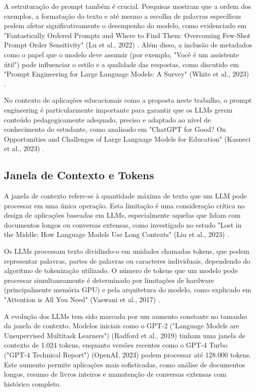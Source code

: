 \documentclass[tcc,capa]{texufpel}
\begin{document}
A estruturação do prompt também é crucial. Pesquisas mostram que a ordem dos exemplos, a formatação do texto e até mesmo a escolha de palavras específicas podem afetar significativamente o desempenho do modelo, como evidenciado em "Fantastically Ordered Prompts and Where to Find Them: Overcoming Few-Shot Prompt Order Sensitivity" (Lu et al., 2022) \cite{lu2022fantastically}. Além disso, a inclusão de metadados como o papel que o modelo deve assumir (por exemplo, "Você é um assistente útil") pode influenciar o estilo e a qualidade das respostas, como discutido em "Prompt Engineering for Large Language Models: A Survey" (White et al., 2023) \cite{white2023prompt}.

No contexto de aplicações educacionais como a proposta neste trabalho, o prompt engineering é particularmente importante para garantir que os LLMs gerem conteúdo pedagogicamente adequado, preciso e adaptado ao nível de conhecimento do estudante, como analisado em "ChatGPT for Good? On Opportunities and Challenges of Large Language Models for Education" (Kasneci et al., 2023) \cite{kasneci2023chatgpt}.

\subsection{Janela de Contexto e Tokens}

A janela de contexto refere-se à quantidade máxima de texto que um LLM pode processar em uma única operação. Esta limitação é uma consideração crítica no design de aplicações baseadas em LLMs, especialmente aquelas que lidam com documentos longos ou conversas extensas, como investigado no estudo "Lost in the Middle: How Language Models Use Long Contexts" (Liu et al., 2023) \cite{liu2023lost}.

Os LLMs processam texto dividindo-o em unidades chamadas tokens, que podem representar palavras, partes de palavras ou caracteres individuais, dependendo do algoritmo de tokenização utilizado. O número de tokens que um modelo pode processar simultaneamente é determinado por limitações de hardware (principalmente memória GPU) e pela arquitetura do modelo, como explicado em "Attention is All You Need" (Vaswani et al., 2017) \cite{vaswani2017attention}.

A evolução dos LLMs tem sido marcada por um aumento constante no tamanho da janela de contexto. Modelos iniciais como o GPT-2 ("Language Models are Unsupervised Multitask Learners") (Radford et al., 2019) \cite{radford2019language} tinham uma janela de contexto de 1.024 tokens, enquanto versões recentes como o GPT-4 Turbo ("GPT-4 Technical Report") (OpenAI, 2023) \cite{openai2023gpt4} podem processar até 128.000 tokens. Este aumento permite aplicações mais sofisticadas, como análise de documentos longos, resumo de livros inteiros e manutenção de conversas extensas com histórico completo.
\end{document}
